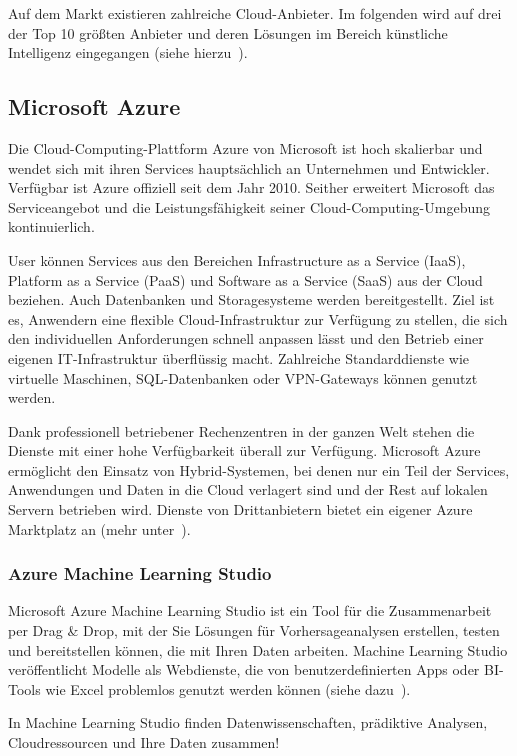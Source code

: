 Auf dem Markt existieren zahlreiche Cloud-Anbieter. Im folgenden wird auf drei der Top 10 größten Anbieter und deren
Lösungen im Bereich künstliche Intelligenz eingegangen (siehe hierzu~\cite{online_grundlagen_cloud}).

\subsection{Microsoft Azure}
Die Cloud-Computing-Plattform Azure von Microsoft ist hoch skalierbar und wendet sich mit ihren Services hauptsächlich
an Unternehmen und Entwickler. Verfügbar ist Azure offiziell seit dem Jahr 2010. Seither erweitert Microsoft das
Serviceangebot und die Leistungsfähigkeit seiner Cloud-Computing-Umgebung kontinuierlich.

User können Services aus den Bereichen Infrastructure as a Service (IaaS), Platform as a Service (PaaS) und Software as
a Service (SaaS) aus der Cloud beziehen. Auch Datenbanken und Storagesysteme werden bereitgestellt. Ziel ist es,
Anwendern eine flexible Cloud-Infrastruktur zur Verfügung zu stellen, die sich den individuellen Anforderungen schnell
anpassen lässt und den Betrieb einer eigenen IT-Infrastruktur überflüssig macht. Zahlreiche Standarddienste wie virtuelle
Maschinen, SQL-Datenbanken oder VPN-Gateways können genutzt werden.

Dank professionell betriebener Rechenzentren in der ganzen Welt stehen die Dienste mit einer hohe Verfügbarkeit überall
zur Verfügung. Microsoft Azure ermöglicht den Einsatz von Hybrid-Systemen, bei denen nur ein Teil der Services,
Anwendungen und Daten in die Cloud verlagert sind und der Rest auf lokalen Servern betrieben wird. Dienste von
Drittanbietern bietet ein eigener Azure Marktplatz an (mehr unter~\cite{online_grundlagen_azure}).

\subsubsection{Azure Machine Learning Studio}
Microsoft Azure Machine Learning Studio ist ein Tool für die Zusammenarbeit per Drag \& Drop, mit der Sie Lösungen für
Vorhersageanalysen erstellen, testen und bereitstellen können, die mit Ihren Daten arbeiten. Machine Learning Studio
veröffentlicht Modelle als Webdienste, die von benutzerdefinierten Apps oder BI-Tools wie Excel problemlos genutzt werden
können (siehe dazu~\cite{article_grundlagen_azure_studio}).

In Machine Learning Studio finden Datenwissenschaften, prädiktive Analysen, Cloudressourcen und Ihre Daten zusammen!

